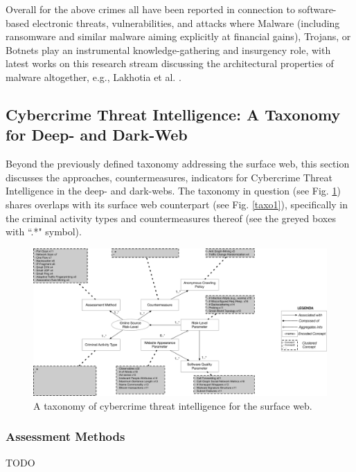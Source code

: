 Overall for the above crimes all have been reported in connection to software-based electronic threats, vulnerabilities, and attacks where Malware (including ransomware and similar malware aiming explicitly at financial gains), Trojans, or Botnets play an instrumental knowledge-gathering and insurgency role, with latest works on this research stream discussing the architectural properties of malware altogether, e.g., Lakhotia et al. \cite{LakhotiaB17}.


\subsection{Cybercrime Threat Intelligence: A Taxonomy for Deep- and Dark-Web}

Beyond the previously defined taxonomy addressing the surface web, this section discusses the approaches, countermeasures, indicators for Cybercrime Threat Intelligence in the deep- and dark-webs. The taxonomy in question (see Fig. \ref{taxo2}) shares overlaps with its surface web counterpart (see Fig. \ref{taxo1}), specifically in the criminal activity types and countermeasures thereof (see the greyed boxes with ``.*" symbol).

\begin{figure}
\begin{center}
\includegraphics[scale=0.3]{./img/taxo2.pdf}
\end{center}
\caption{A taxonomy of cybercrime threat intelligence for the surface web.}\label{taxo2}
\end{figure}


\subsubsection{Assessment Methods}

TODO\\


